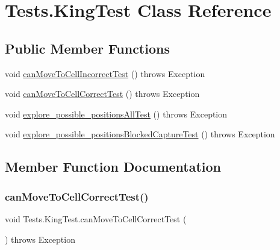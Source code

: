 \hypertarget{class_tests_1_1_king_test}{}\section{Tests.\+King\+Test Class Reference}
\label{class_tests_1_1_king_test}
\subsection*{Public Member Functions}
\begin{DoxyCompactItemize}
\item 
void \hyperlink{class_tests_1_1_king_test_a734190e8769bb063e940021fe3aa4bd7}{can\+Move\+To\+Cell\+Incorrect\+Test} ()  throws Exception 
\item 
void \hyperlink{class_tests_1_1_king_test_aee8a0e677bbdd3f7de9967f3440986ca}{can\+Move\+To\+Cell\+Correct\+Test} ()  throws Exception 
\item 
void \hyperlink{class_tests_1_1_king_test_a9b38d5a81970a89bc5da02ecd10310c7}{explore\+\_\+possible\+\_\+positions\+All\+Test} ()  throws Exception 
\item 
void \hyperlink{class_tests_1_1_king_test_a83fff4dc942782651cdc9316b28b67da}{explore\+\_\+possible\+\_\+positions\+Blocked\+Capture\+Test} ()  throws Exception 
\end{DoxyCompactItemize}


\subsection{Member Function Documentation}
\mbox{\label{class_tests_1_1_king_test_aee8a0e677bbdd3f7de9967f3440986ca}} 
\subsubsection{\texorpdfstring{can\+Move\+To\+Cell\+Correct\+Test()}{canMoveToCellCorrectTest()}}
{\footnotesize\ttfamily void Tests.\+King\+Test.\+can\+Move\+To\+Cell\+Correct\+Test (\begin{DoxyParamCaption}{ }\end{DoxyParamCaption}) throws Exception\hspace{0.3cm}{\ttfamily [inline]}}

